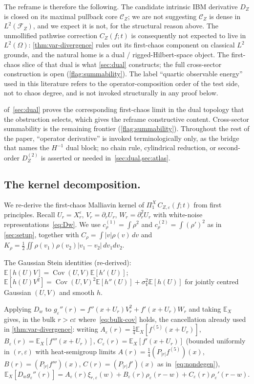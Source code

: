 \documentclass[EJP]{ejpecp}
\renewcommand{\E}{\mathbb{E}}
\newcommand{\IBM}{Z}
\newcommand{\Pir}{\Pi}
\DeclareMathOperator{\Cov}{Cov}
\begin{document}
The reframe is therefore the following. The candidate intrinsic IBM
derivative $D_\IBM$ is closed on its maximal pullback core
$\mathcal C_\IBM$; we are not suggesting $\mathcal C_\IBM$ is dense
in $L^{2}(\mathcal F_\IBM)$, and we expect it is not, for the
structural reason above. The unmollified pathwise correction
$C_\IBM(f;t)$ is consequently not expected to live in
$L^{2}(\Omega)$: \cref{thm:var-divergence} rules out its first-chaos
component on classical $L^{2}$ grounds, and the natural home is a
dual / rigged-Hilbert-space object. The first-chaos slice of that
dual is what \cref{sec:dual} constructs; the full cross-sector
construction is open (\cref{flag:summability}). The label
``quartic observable energy'' used in this literature refers to the
operator-composition order of the test side, not to chaos degree,
and is not invoked structurally in any proof below.

 of~\cref{sec:dual} proves the corresponding
first-chaos limit in the dual topology that the obstruction selects,
which gives the reframe constructive content.
Cross-sector summability is the remaining frontier
(\cref{flag:summability}). Throughout the rest of the paper,
``operator derivative'' is invoked terminologically only, as the
bridge that names the $H^{-1}$ dual block; no chain rule,
cylindrical reduction, or second-order $D_\IBM^{(2)}$ is asserted
or needed in~\cref{sec:dual,sec:atlas}.

\subsection*{The kernel decomposition.}

We re-derive the first-chaos Malliavin kernel of
$\Pir_1^{X}\,C_{\IBM,\varepsilon}(f;t)$ from first principles. Recall
$U_r=X^\varepsilon_r$, $V_r=\partial_r U_r$, $W_r=\partial_r^{2}U_r$
with white-noise representations~\eqref{eq:Dw}. We use
$c_\rho^{(1)}=\int\rho^{2}$ and $c_\rho^{(2)}=\int(\rho')^{2}$ as in
\cref{sec:setup}, together with $C_\rho=\int|v|\rho(v)\,dv$ and
$K_\rho=\tfrac12\!\iint\rho(v_1)\rho(v_2)|v_1-v_2|\,dv_1dv_2$.

The Gaussian Stein identities (re-derived):
$\E[h(U)V]=\Cov(U,V)\E[h'(U)]$;
$\E[h(U)V^{2}]=\Cov(U,V)^{2}\E[h''(U)]+\sigma_V^{2}\E[h(U)]$ for
jointly centred Gaussian $(U,V)$ and smooth $h$.

Applying $D_w$ to
$g_\varepsilon''(r)=f''(x+U_r)V_r^{2}+f'(x+U_r)W_r$ and taking
$\E_X$ gives, in the bulk $r>c\varepsilon$
where~\eqref{eq:bulk-cov} holds, the cancellation already used in
\cref{thm:var-divergence}: writing
$A_\varepsilon(r)=\tfrac14\E_X[f^{(5)}(x+U_r)]$,
$B_\varepsilon(r)=\E_X[f'''(x+U_r)]$,
$C_\varepsilon(r)=\E_X[f'(x+U_r)]$ (bounded uniformly in
$(r,\varepsilon)$ with heat-semigroup limits
$A(r)=\tfrac14(P_{|r|}f^{(5)})(x)$, $B(r)=(P_{|r|}f''')(x)$,
$C(r)=(P_{|r|}f')(x)$ as in~\eqref{eq:nondegen}),
\begin{equation}\label{eq:kernel-form}
 \E_{X}[D_{w}g_{\varepsilon}''(r)]
 =A_{\varepsilon}(r)\xi_{r,\varepsilon}(w)+B_{\varepsilon}(r)\rho_{\varepsilon}(r-w)
 +C_{\varepsilon}(r)\rho_{\varepsilon}'(r-w).
\end{equation}
\end{document}

